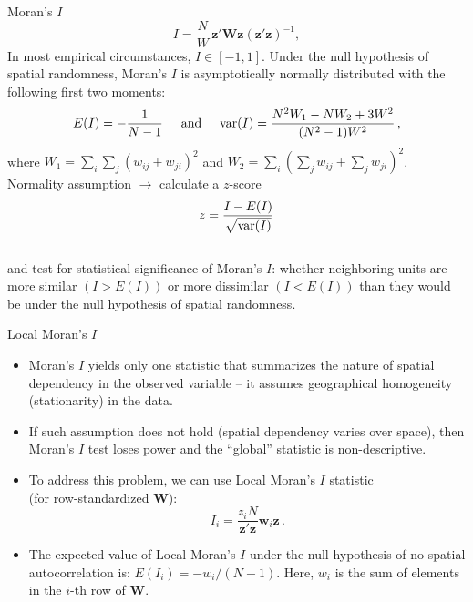 \documentclass{beamer}
\begin{document}
\begin{frame}{Moran's $I$}
\vspace{-0.2cm}
\begin{equation*}
I = \frac{N}{W}\,\bm{z}'\bm{Wz}(\bm{z}'\bm{z})^{-1},
\end{equation*}     
In most empirical circumstances, $I \in [ -1,1 ]$. Under the null hypothesis of spatial randomness, Moran’s $I$ is asymptotically normally distributed with the following first two moments:
\begin{equation*}
E(I) = -\frac{1}{N-1} \hspace{0.5cm} 
\textnormal{and} \hspace{0.5cm} 
\textnormal{var}(I) = \frac{N^2W_1 - NW_2 +3W^2}{(N^2-1)W^2} \,,
\end{equation*}  
where $W_1 = \sum_i \sum_j (w_{ij}+w_{ji})^2$ and $W_2 = \sum_i (\sum_j w_{ij} + \sum_j w_{ji})^2$.\\
\medskip
Normality assumption $\rightarrow$ calculate a $z$-score 
$$z=\frac{I-E(I)}{\sqrt{\textnormal{var}(I)}} $$\\
and test for statistical significance of Moran's $I$: whether neighboring units are more similar $(I > E(I))$ or more dissimilar $(I < E(I))$ than they would be under the null hypothesis of spatial randomness.
\end{frame}
\begin{frame}{Local Moran's $I$}
\begin{itemize}
    \item Moran's $I$ yields only one statistic that summarizes the nature of spatial dependency in the observed variable -- it assumes geographical homogeneity (stationarity) in the data. 
    \smallskip
    \item If such assumption does not hold (spatial dependency varies over space), then Moran's $I$ test loses power and the ``global'' statistic is non-descriptive. 
    \smallskip
    \item To address this problem, we can use Local Moran's $I$ statistic \\(for row-standardized $\bm{W}$):
    \begin{equation*}
    I_i = \frac{z_iN}{\bm{z}'\bm{z}}\bm{w}_{i}\bm{z} \, .
    \end{equation*}    
    \item The expected value of  Local Moran's $I$ under the null hypothesis of no spatial autocorrelation is: $E(I_i)=-w_i/(N-1)$. Here, $w_i$ is the sum of elements in the $i$-th row of $\bm{W}$.
\end{itemize}
\end{frame}
\end{document}
